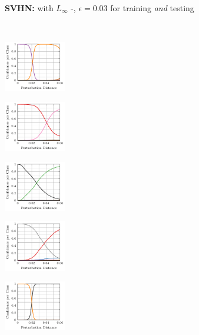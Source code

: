 \begin{figure}[t]
    \centering
    \footnotesize
    \begin{subfigure}{1\textwidth}
        \centering
        \textbf{SVHN:} \textbf{\AdvTrain} with $L_\infty$ \PGD-\FConf, $\epsilon = 0.03$ for training \emph{and} testing
    \end{subfigure}
    \\[2px]
    \begin{subfigure}{0.19\textwidth}
        \includegraphics[height=2.2cm]{fig_svhn_advtrain_0_adversarial}
    \end{subfigure}
    \begin{subfigure}{0.19\textwidth}
        \includegraphics[height=2.2cm]{fig_svhn_advtrain_1_adversarial}
    \end{subfigure}
    \begin{subfigure}{0.19\textwidth}
        \includegraphics[height=2.2cm]{fig_svhn_advtrain_2_adversarial}
    \end{subfigure}
    \begin{subfigure}{0.19\textwidth}
        \includegraphics[height=2.2cm]{fig_svhn_advtrain_3_adversarial}
    \end{subfigure}
    \begin{subfigure}{0.19\textwidth}
        \includegraphics[height=2.2cm]{fig_svhn_advtrain_4_adversarial}

\end{subfigure}
\end{figure}
